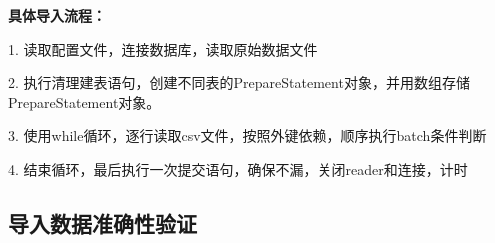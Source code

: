 \documentclass[11pt]{article}
\begin{document}
\hspace{-2em} \textbf{具体导入流程：}\par
\hspace{-1em}1. 读取配置文件，连接数据库，读取原始数据文件\par
\hspace{-1em}2. 执行清理建表语句，创建不同表的PrepareStatement对象，并用数组存储PrepareStatement对象。\par
\hspace{-1em}3. 使用while循环，逐行读取csv文件，按照外键依赖，顺序执行batch条件判断\par
\hspace{-1em}4. 结束循环，最后执行一次提交语句，确保不漏，关闭reader和连接，计时\par

\subsection{导入数据准确性验证}
\end{document}
